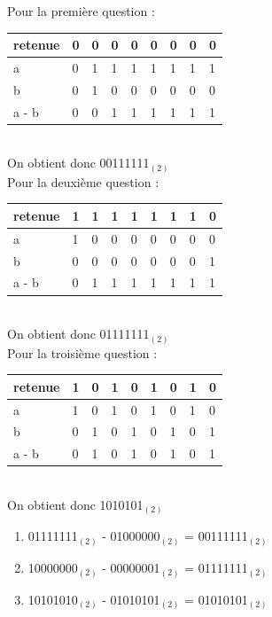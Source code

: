 \begin{Exercice}[15 minutes]
\begin{solution}
Pour la première question : \\
\begin{tabular}{| p{1cm} | p{1cm} | p{1cm} | p{1cm} | p{1cm} | p{1cm} | p{1cm} | p{1cm} | p{1cm} |} 
    \hline
retenue & 0 & 0 & 0 & 0 & 0 & 0 & 0 & 0 \\ [0.5ex]
\hline
          a & 0 & 1 & 1 & 1 & 1 & 1 & 1 & 1 \\ [0.5ex] 
    \hline
          b & 0 & 1 & 0 & 0 & 0 & 0 & 0 & 0 \\ [0.5ex] 
    \hline
    a - b   & 0 & 0 & 1 & 1 & 1 & 1 & 1 & 1 \\ [0.5ex]
    \hline
\end{tabular} \\
On obtient donc 00111111$_{(2)}$ \\


Pour la deuxième question : \\
\begin{tabular}{| p{1cm} | p{1cm} | p{1cm} | p{1cm} | p{1cm} | p{1cm} | p{1cm} | p{1cm} | p{1cm} |} 
    \hline
retenue & 1 & 1 & 1 & 1 & 1 & 1 & 1 & 0 \\ [0.5ex]
\hline
    a & 1 & 0 & 0 & 0 & 0 & 0 & 0 & 0 \\ [0.5ex] 
    \hline
    b & 0 & 0 & 0 & 0 & 0 & 0 & 0 & 1 \\ [0.5ex] 
    \hline
    a - b & 0 & 1 & 1 & 1 & 1 & 1 & 1 & 1 \\ [0.5ex]
    \hline
\end{tabular} \\
On obtient donc 01111111$_{(2)}$ \\

Pour la troisième question : \\
\begin{tabular}{| p{1cm} | p{1cm} | p{1cm} | p{1cm} | p{1cm} | p{1cm} | p{1cm} | p{1cm} | p{1cm} |} 
    \hline
retenue & 1 & 0 & 1 & 0 & 1 & 0 & 1 & 0 \\ [0.5ex]
\hline
    a & 1 & 0 & 1 & 0 & 1 & 0 & 1 & 0 \\ [0.5ex] 
    \hline
    b & 0 & 1 & 0 & 1 & 0 & 1 & 0 & 1 \\ [0.5ex] 
    \hline
    a - b & 0 & 1 & 0 & 1 & 0 & 1 & 0 & 1 \\ [0.5ex]
    \hline
\end{tabular} \\
On obtient donc 1010101$_{(2)}$ \\
 		
 		\begin{enumerate}
        \item 01111111$_{(2)}$ - 01000000$_{(2)}$ = 00111111$_{(2)}$
        \item 10000000$_{(2)}$ - 00000001$_{(2)}$ = 01111111$_{(2)}$
        \item 10101010$_{(2)}$ - 01010101$_{(2)}$ = 01010101$_{(2)}$
    \end{enumerate}
    \end{solution}


\end{Exercice}
